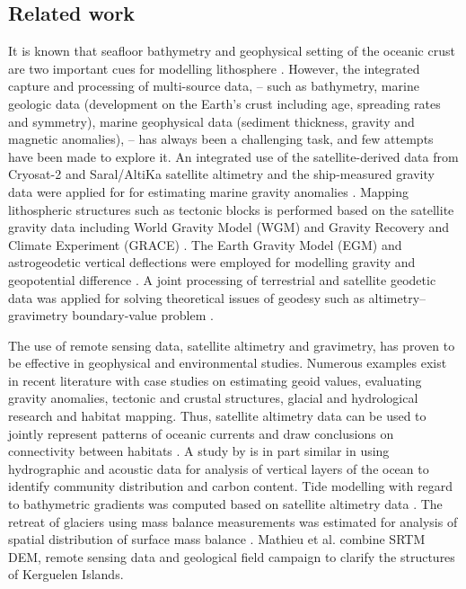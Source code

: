 \documentclass[land,article,submit,pdftex,moreauthors]{Definitions/mdpi}
\begin{document}
\subsection{Related work}

It is known that seafloor bathymetry and geophysical setting of the oceanic crust are two important cues for modelling lithosphere \cite{WATSON201697}. However, the integrated capture and processing of multi-source data, -- such as bathymetry, marine geologic data (development on the Earth's crust including age, spreading rates and symmetry), marine geophysical data (sediment thickness, gravity and magnetic anomalies), -- has always been a challenging task, and few attempts have been made to explore it. An integrated use of the satellite-derived data from Cryosat-2 and Saral/AltiKa satellite altimetry and the ship-measured gravity data were applied for for estimating marine gravity anomalies \cite{NGUYEN2020505}. Mapping lithospheric structures such as tectonic blocks is performed based on the satellite gravity data including World Gravity Model (WGM) and Gravity Recovery and Climate Experiment (GRACE) \cite{EMISHAW2023104775}. The Earth Gravity Model (EGM) and astrogeodetic vertical deflections were employed for modelling gravity  and geopotential difference \cite{WANG2023}. A joint processing of terrestrial and satellite geodetic data was applied for solving theoretical issues of geodesy such as altimetry–gravimetry boundary-value problem \cite{Lehmann}.

The use of remote sensing data, satellite altimetry and gravimetry, has proven to be effective in geophysical and environmental studies. Numerous examples exist in recent literature with case studies on estimating geoid values, evaluating gravity anomalies, tectonic and crustal structures, glacial and hydrological research and habitat mapping. Thus, satellite altimetry data can be used to jointly represent patterns of oceanic currents and draw conclusions on connectivity between habitats \cite{MORI201645}. A study by \cite{COTTE2022103650} is in part similar in using hydrographic and acoustic data for analysis of vertical layers of the ocean to identify community distribution and carbon content. Tide modelling with regard to bathymetric gradients was computed based on satellite altimetry data \cite{Maraldi}. The retreat of glaciers using mass balance measurements was estimated for analysis of spatial distribution of surface mass balance \cite{Verfaillie}. Mathieu et al. \cite{MATHIEU2011206} combine SRTM DEM, remote sensing data and geological field campaign to clarify the structures of Kerguelen Islands. 
\end{document}
